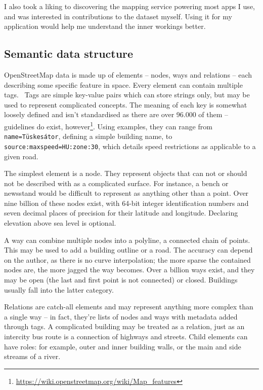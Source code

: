 I also took a liking to discovering the mapping service powering most apps I use, and was interested in contributions to the dataset myself. Using it for my application would help me understand the inner workings better.

\subsection{Semantic data structure}

OpenStreetMap data is made up of elements -- nodes, ways and relations -- each describing some specific feature in space. Every element can contain multiple tags.~\cite{osmElements} Tags are simple key-value pairs which can store strings only, but may be used to represent complicated concepts. The meaning of each key is somewhat loosely defined and isn't standardised as there are over 96.000 of them -- guidelines do exist, however\footnote{\url{https://wiki.openstreetmap.org/wiki/Map_features}}. Using examples, they can range from \verb|name=Tüskesátor|, defining a simple building name, to \verb|source:maxspeed=HU:zone:30|, which details speed restrictions as applicable to a given road.

The simplest element is a node. They represent objects that can not or should not be described with as a complicated surface. For instance, a bench or newsstand would be difficult to represent as anything other than a point. Over nine billion of these nodes exist, with 64-bit integer identification numbers and seven decimal places of precision for their latitude and longitude. Declaring elevation above sea level is optional.

A way can combine multiple nodes into a polyline, a connected chain of points. This may be used to add a building outline or a road. The accuracy can depend on the author, as there is no curve interpolation; the more sparse the contained nodes are, the more jagged the way becomes. Over a billion ways exist, and they may be open (the last and first point is not connected) or closed. Buildings usually fall into the latter category.

Relations are catch-all elements and may represent anything more complex than a single way -- in fact, they're lists of nodes and ways with metadata added through tags. A complicated building may be treated as a relation, just as an intercity bus route is a connection of highways and streets. Child elements can have roles: for example, outer and inner building walls, or the main and side streams of a river.

